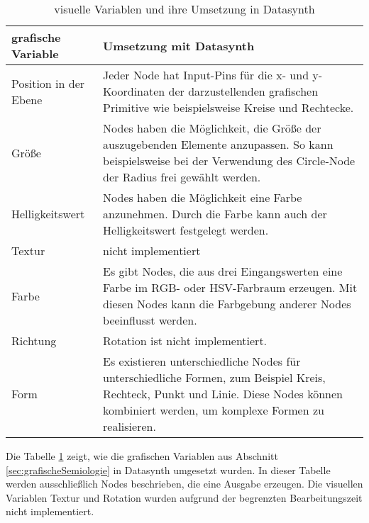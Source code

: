 \documentclass[a4paper, 
               12pt,
               DIV=calc,
               version=first,
               pdftex,
               headsepline,
               footsepline,
               bibtotocnumbered,
               liststotocnumbered]{scrreprt}
\begin{document}
\begin{table}
\centering
\begin{tabular}{|l|p{9cm}|}
\hline
\textbf{grafische Variable} & \textbf{Umsetzung mit Datasynth}\\
\hline
Position in der Ebene & Jeder Node hat Input-Pins für die x- und y-Koordinaten der darzustellenden grafischen Primitive wie
beispielsweise Kreise und Rechtecke.\\
\hline
Größe & Nodes haben die Möglichkeit, die Größe der auszugebenden Elemente anzupassen.
So kann beispielsweise bei der Verwendung des Circle-Node der Radius frei gewählt werden.\\
\hline
Helligkeitswert & Nodes haben die Möglichkeit eine Farbe anzunehmen. Durch die Farbe kann
auch der Helligkeitswert festgelegt werden.\\
\hline
Textur & nicht implementiert\\
\hline
Farbe & Es gibt Nodes, die aus drei Eingangswerten eine Farbe im RGB- oder HSV-Farbraum erzeugen. Mit diesen Nodes kann die Farbgebung
anderer Nodes beeinflusst werden.\\
\hline
Richtung & Rotation ist nicht implementiert.\\
\hline
Form & Es existieren unterschiedliche Nodes für unterschiedliche Formen, zum Beispiel Kreis, Rechteck, Punkt und Linie. Diese Nodes
können kombiniert werden, um komplexe Formen zu realisieren.\\
\hline
\end{tabular}
\caption{visuelle Variablen und ihre Umsetzung in Datasynth}
\label{tab:vars}
\end{table}
Die Tabelle \ref{tab:vars} zeigt, wie die grafischen Variablen aus Abschnitt
\ref{sec:grafischeSemiologie} in Datasynth umgesetzt wurden. In dieser Tabelle werden ausschließlich
Nodes beschrieben, die eine Ausgabe erzeugen. Die visuellen Variablen Textur und Rotation
wurden aufgrund der begrenzten Bearbeitungszeit nicht implementiert.
\end{document}
